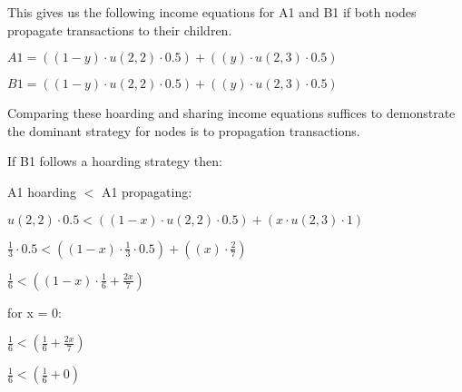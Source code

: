 \documentclass[oneside]{article}   	%
\begin{document}
\begin{multicols}{2}
This gives us the following income equations for A1 and B1 if both nodes propagate transactions to their children.

\normalsize
\begin{adjustwidth}{1.5em}{1.5em} 
	\begin{math}
A1 = ((1 - y) \cdot u(2, 2) \cdot 0.5) + ((y) \cdot u(2, 3) \cdot 0.5)
	\end{math}

	\begin{math}
B1 = ((1 - y) \cdot u(2, 2) \cdot 0.5) + ((y) \cdot u(2, 3) \cdot 0.5)
	\end{math}
\end{adjustwidth}
\normalsize

Comparing these hoarding and sharing income equations suffices to demonstrate the dominant strategy for nodes is to propagation transactions. 

If B1 follows a hoarding strategy then:

A1 hoarding \begin{math}<\end{math} A1 propagating:

\normalsize
\begin{adjustwidth}{1.5em}{1.5em} 
	\begin{math}
u(2,2) \cdot 0.5 < ((1 - x) \cdot u(2,2) \cdot 0.5) + (x \cdot u(2,3) \cdot 1)
	\end{math}

	\begin{math}
\frac{1}{3} \cdot 0.5 < ( (1 - x) \cdot \frac{1}{3} \cdot 0.5) + ( (x) \cdot \frac{2}{7} )
	\end{math}

	\begin{math}
\frac{1}{6} < \left( (1 - x) \cdot \frac{1}{6} + \frac{2x}{7} \right)
	\end{math}
\end{adjustwidth}
\normalsize

for x = 0:

\large
\begin{adjustwidth}{1.5em}{1.5em} 
	\begin{math}
\frac{1}{6} < \left(\frac{1}{6} + \frac{2x}{7}\right)
	\end{math}

	\begin{math}
 \frac{1}{6} < \left(\frac{1}{6} + 0\right)
	\end{math}
\end{adjustwidth}
\normalsize


\end{multicols}
\end{document}
